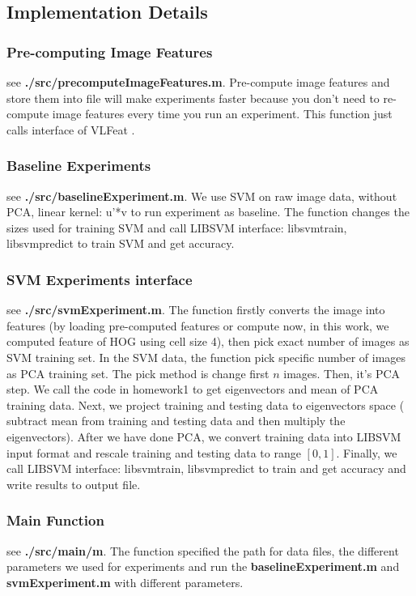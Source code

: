 \documentclass[10pt,twocolumn,letterpaper]{article}
\begin{document}
\subsection{Implementation Details}
\subsubsection{Pre-computing Image Features}
see \textbf{./src/precomputeImageFeatures.m}. Pre-compute image features and store them into file will make experiments faster because you don't need to re-compute image features every time you run an experiment. This function just calls interface of VLFeat \cite{vedaldi08vlfeat}.


\subsubsection{Baseline Experiments}
see \textbf{./src/baselineExperiment.m}. We use SVM on raw image data, without PCA, linear kernel: u'*v to run experiment as baseline. The function changes the sizes used for training SVM and call LIBSVM interface: libsvmtrain, libsvmpredict to train SVM and get accuracy.
\subsubsection{SVM Experiments interface}
see \textbf{./src/svmExperiment.m}. The function firstly converts the image into features (by loading pre-computed features or compute now, in this work, we computed feature of HOG \cite{dalal2005histograms} using cell size 4), then pick exact number of images as SVM training set. In the SVM data, the function pick specific number of images as PCA training set. The pick method is change first $n$ images. Then, it's PCA step. We call the code in homework1 to get eigenvectors and mean of PCA training data. Next, we project training and testing data to eigenvectors space ( subtract mean from training and testing data and then multiply the eigenvectors). After we have done PCA, we convert training data into LIBSVM input format and rescale training and testing data to range $[0, 1]$. Finally, we call LIBSVM interface: libsvmtrain, libsvmpredict to train and get accuracy and write results to output file.

\subsubsection{Main Function}
see \textbf{./src/main/m}. The function specified the path for data files, the different parameters we used for experiments and run the \textbf{baselineExperiment.m} and \textbf{svmExperiment.m} with different parameters.
\end{document}

